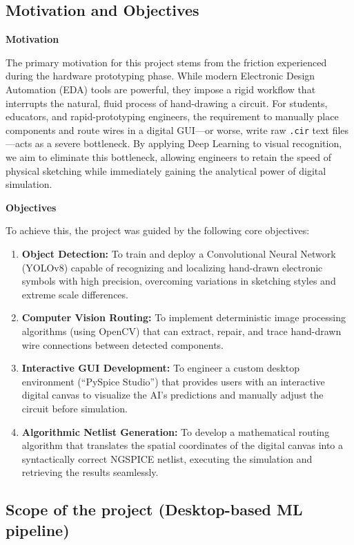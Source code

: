 \documentclass[12pt]{article}
\begin{document}
\subsection{Motivation and Objectives}
\noindent \textbf{Motivation}\par
The primary motivation for this project stems from the friction experienced during the hardware prototyping phase. While modern Electronic Design Automation (EDA) tools are powerful, they impose a rigid workflow that interrupts the natural, fluid process of hand-drawing a circuit. For students, educators, and rapid-prototyping engineers, the requirement to manually place components and route wires in a digital GUI—or worse, write raw \texttt{.cir} text files—acts as a severe bottleneck. By applying Deep Learning to visual recognition, we aim to eliminate this bottleneck, allowing engineers to retain the speed of physical sketching while immediately gaining the analytical power of digital simulation.

\vspace{0.5cm}
\noindent \textbf{Objectives}\par
To achieve this, the project was guided by the following core objectives:
\begin{enumerate}
    \item \textbf{Object Detection:} To train and deploy a Convolutional Neural Network (YOLOv8) capable of recognizing and localizing hand-drawn electronic symbols with high precision, overcoming variations in sketching styles and extreme scale differences.
    \item \textbf{Computer Vision Routing:} To implement deterministic image processing algorithms (using OpenCV) that can extract, repair, and trace hand-drawn wire connections between detected components.
    \item \textbf{Interactive GUI Development:} To engineer a custom desktop environment (``PySpice Studio'') that provides users with an interactive digital canvas to visualize the AI's predictions and manually adjust the circuit before simulation.
    \item \textbf{Algorithmic Netlist Generation:} To develop a mathematical routing algorithm that translates the spatial coordinates of the digital canvas into a syntactically correct NGSPICE netlist, executing the simulation and retrieving the results seamlessly.
\end{enumerate}

\subsection{Scope of the project (Desktop-based ML pipeline)}
\end{document}
